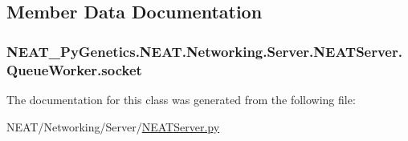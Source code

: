 \subsection{Member Data Documentation}
\subsubsection[{\texorpdfstring{socket}{socket}}]{\setlength{\rightskip}{0pt plus 5cm}N\+E\+A\+T\+\_\+\+Py\+Genetics.\+N\+E\+A\+T.\+Networking.\+Server.\+N\+E\+A\+T\+Server.\+Queue\+Worker.\+socket}\hypertarget{classNEAT__PyGenetics_1_1NEAT_1_1Networking_1_1Server_1_1NEATServer_1_1QueueWorker_ad5eb20f5b3bfb6a6aafa945bd5103c1b}{}\label{classNEAT__PyGenetics_1_1NEAT_1_1Networking_1_1Server_1_1NEATServer_1_1QueueWorker_ad5eb20f5b3bfb6a6aafa945bd5103c1b}


The documentation for this class was generated from the following file\+:\begin{DoxyCompactItemize}
\item 
N\+E\+A\+T/\+Networking/\+Server/\hyperlink{NEATServer_8py}{N\+E\+A\+T\+Server.\+py}\end{DoxyCompactItemize}
